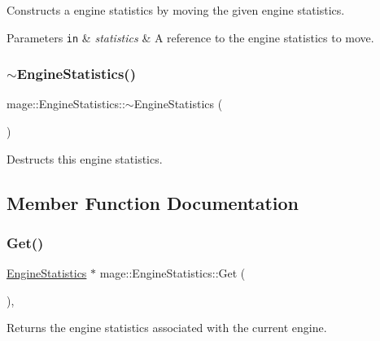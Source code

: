 Constructs a engine statistics by moving the given engine statistics.


\begin{DoxyParams}[1]{Parameters}
\mbox{\tt in}  & {\em statistics} & A reference to the engine statistics to move. \\
\hline
\end{DoxyParams}
\hypertarget{classmage_1_1_engine_statistics_a471f643061b881ae69cc807b34c48127}{}\label{classmage_1_1_engine_statistics_a471f643061b881ae69cc807b34c48127} 
\subsubsection{\texorpdfstring{$\sim$\+Engine\+Statistics()}{~EngineStatistics()}}
{\footnotesize\ttfamily mage\+::\+Engine\+Statistics\+::$\sim$\+Engine\+Statistics (\begin{DoxyParamCaption}{ }\end{DoxyParamCaption})\hspace{0.3cm}{\ttfamily [default]}}

Destructs this engine statistics. 

\subsection{Member Function Documentation}
\hypertarget{classmage_1_1_engine_statistics_a7eb0d3a988676f71eea8e9f26ab07f42}{}\label{classmage_1_1_engine_statistics_a7eb0d3a988676f71eea8e9f26ab07f42} 
\subsubsection{\texorpdfstring{Get()}{Get()}}
{\footnotesize\ttfamily \hyperlink{classmage_1_1_engine_statistics}{Engine\+Statistics} $\ast$ mage\+::\+Engine\+Statistics\+::\+Get (\begin{DoxyParamCaption}{ }\end{DoxyParamCaption})\hspace{0.3cm}{\ttfamily [static]}, {\ttfamily [noexcept]}}

Returns the engine statistics associated with the current engine.

